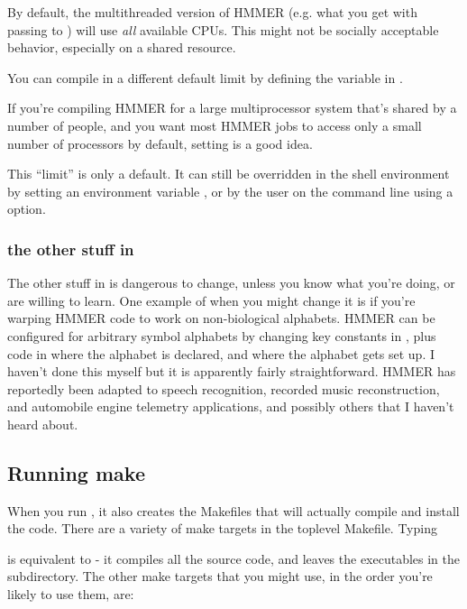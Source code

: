 By default, the multithreaded version of HMMER (e.g. what you get with
passing  to ) will use
\emph{all} available CPUs. This might not be socially acceptable
behavior, especially on a shared resource. 

You can compile in a different default limit by defining the
 variable in .

If you're compiling HMMER for a large multiprocessor system that's
shared by a number of people, and you want most HMMER jobs to access
only a small number of processors by default, setting
 is a good idea.

This ``limit'' is only a default. It can still be overridden in the
shell environment by setting an environment variable
, or by the user on the command line using a
 option.

\subsubsection{the other stuff in }

The other stuff in  is dangerous to change, unless you
know what you're doing, or are willing to learn. One example of when
you might change it is if you're warping HMMER code to work on
non-biological alphabets. HMMER can be configured for arbitrary symbol
alphabets by changing key constants in , plus code in
 where the alphabet is declared, and 
where the alphabet gets set up. I haven't done this myself but it is
apparently fairly straightforward. HMMER has reportedly been adapted
to speech recognition, recorded music reconstruction, and automobile
engine telemetry applications, and possibly others that I haven't
heard about.

\subsection{Running make}

When you run , it also creates the Makefiles that will
actually compile and install the code.  There are a variety of make
targets in the toplevel Makefile. Typing


is equivalent to  - it compiles all the source code,
and leaves the executables in the  subdirectory.  The other
make targets that you might use, in the order you're likely to use
them, are:

